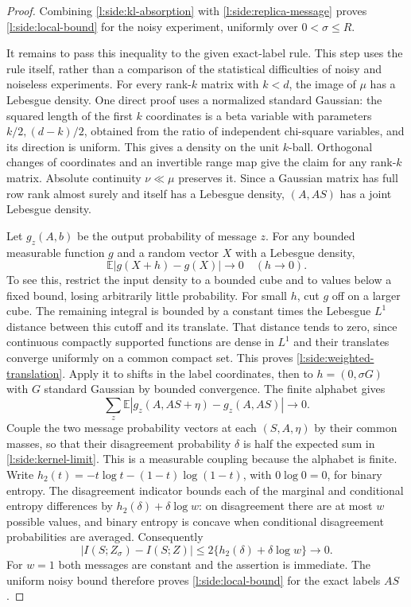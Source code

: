 \begin{proof}
Combining \eqref{l:side:kl-absorption} with
\eqref{l:side:replica-message} proves \eqref{l:side:local-bound} for the
noisy experiment, uniformly over $0<\sigma\le R$.

It remains to pass this inequality to the given exact-label rule.  This
step uses the rule itself, rather than a comparison of the statistical
difficulties of noisy and noiseless experiments.  For every rank-$k$
matrix with $k<d$, the image of $\mu$ has a Lebesgue density.  One direct
proof uses a normalized standard Gaussian: the squared length of the
first $k$ coordinates is a beta variable with parameters
$k/2,(d-k)/2$, obtained from the ratio of independent chi-square
variables, and its direction is uniform.  This gives a density on the
unit $k$-ball.  Orthogonal changes of coordinates and an invertible
range map give the claim for any rank-$k$ matrix.  Absolute continuity
$\nu\ll\mu$ preserves it.  Since a Gaussian matrix has full row rank
almost surely and itself has a Lebesgue density, $(A,AS)$ has a joint
Lebesgue density.

Let $g_z(A,b)$ be the output probability of message $z$.  For any bounded
measurable function $g$ and a random vector $X$ with a Lebesgue density,
\begin{equation}\label{l:side:weighted-translation}
 \mathbb E|g(X+h)-g(X)|\longrightarrow0\quad(h\to0).
\end{equation}
To see this, restrict the input density to a bounded cube and to values
below a fixed bound, losing arbitrarily little probability.  For small
$h$, cut $g$ off on a larger cube.  The remaining integral is bounded
by a constant times the Lebesgue $L^1$ distance between this cutoff and
its translate.  That distance tends to zero, since continuous compactly
supported functions are dense in $L^1$ and their translates converge
uniformly on a common compact set.  This proves
\eqref{l:side:weighted-translation}.  Apply it to shifts in the label
coordinates, then to $h=(0,\sigma G)$ with $G$ standard Gaussian by
bounded convergence.  The finite alphabet gives
\begin{equation}\label{l:side:kernel-limit}
 \sum_z\mathbb E|g_z(A,AS+\eta)-g_z(A,AS)|\longrightarrow0.
\end{equation}
Couple the two message probability vectors at each $(S,A,\eta)$ by their
common masses, so that their disagreement probability $\delta$ is half
the expected sum in \eqref{l:side:kernel-limit}.  This is a measurable
coupling because the alphabet is finite.  Write
$h_2(t)=-t\log t-(1-t)\log(1-t)$, with $0\log0=0$, for binary entropy.
The disagreement indicator bounds each of the marginal and conditional entropy differences by
$h_2(\delta)+\delta\log w$: on disagreement there are at most $w$
possible values, and binary entropy is concave when conditional
disagreement probabilities are averaged.  Consequently
\[
 |I(S;Z_\sigma)-I(S;Z)|
 \le2\{h_2(\delta)+\delta\log w\}\longrightarrow0.
\]
For $w=1$ both messages are constant and the assertion is immediate.
The uniform noisy bound therefore proves \eqref{l:side:local-bound}
for the exact labels $AS$.
\end{proof}

